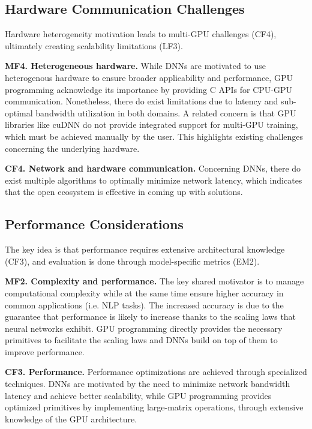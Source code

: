 \subsection*{Hardware Communication Challenges}
Hardware heterogeneity motivation leads to multi-GPU challenges (CF4), ultimately creating
scalability limitations (LF3).

\textbf{MF4. Heterogeneous hardware.}
While DNNs are motivated to use heterogenous hardware to ensure broader applicability and
performance, GPU programming acknowledge its importance by providing C APIs for CPU-GPU
communication. Nonetheless, there do exist limitations due to latency and sub-optimal bandwidth
utilization in both domains. A related concern is that GPU libraries like cuDNN do not provide
integrated support for multi-GPU training, which must be achieved manually by the user. This
highlights existing challenges concerning the underlying hardware.

\textbf{CF4. Network and hardware communication.}
Concerning DNNs, there do exist multiple algorithms to optimally minimize network latency, which
indicates that the open ecosystem is effective in coming up with solutions.

\subsection*{Performance Considerations}
The key idea is that performance requires extensive architectural knowledge (CF3), and evaluation
is done through model-specific metrics (EM2).

\textbf{MF2. Complexity and performance.}
The key shared motivator is to manage computational complexity while at the same time ensure higher accuracy
in common applications (i.e. NLP tasks). The increased accuracy is due to the guarantee that performance
is likely to increase thanks to the scaling laws that neural networks exhibit.
GPU programming directly provides the necessary primitives to facilitate the scaling laws and DNNs build on
top of them to improve performance.

\textbf{CF3. Performance.}
Performance optimizations are achieved through specialized techniques. DNNs are motivated by the need to
minimize network bandwidth latency and achieve better scalability, while GPU programming provides
optimized primitives by implementing large-matrix operations, through extensive knowledge of the GPU architecture.

